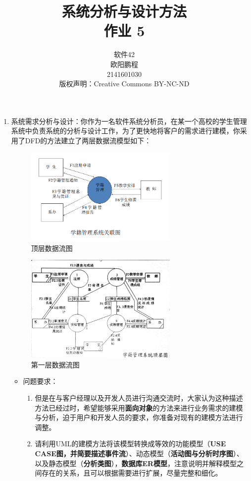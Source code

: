 \documentclass[UTF8]{ctexart}
\title{系统分析与设计方法 \\ 作业 5}
\author{软件42 \\ 欧阳鹏程 \\ 2141601030 \\ 版权声明：Creative Commons BY-NC-ND}
\begin{document}
\maketitle

\begin{enumerate}
	\item 
	系统需求分析与设计：你作为一名软件系统分析员，在某一个高校的学生管理系统中负责系统的分析与设计工作，为了更快地将客户的需求进行建模，你采用了DFD的方法建立了两层数据流模型如下：
	\begin{figure}[H]
		\centering
		\includegraphics[width=0.7\textwidth]{1}
		\caption{顶层数据流图}
		\label{fig:1}
	\end{figure}
	\begin{figure}[H]
		\centering
		\includegraphics[width=0.7\textwidth]{2}
		\caption{第一层数据流图}
		\label{fig:2}
	\end{figure}
	\begin{itemize}
		\item 问题要求：
		\begin{enumerate}
			\item 但是在与客户经理以及开发人员进行沟通交流时，大家认为这种描述方法已经过时，希望能够采用\textbf{面向对象}的方法来进行业务需求的建模与分析，迫于用户和开发人员的要求，你准备对现有的建模方法进行调整。
			\item 请利用UML的建模方法将该模型转换成等效的功能模型（\textbf{USE CASE图，并简要描述事件流}）、动态模型（\textbf{活动图与分析时序图}）、以及静态模型（\textbf{分析类图}），\textbf{数据库ER模型}，注意说明并解释模型之间存在的关系，且可以根据需要进行扩展，尽量完整和细化。
		\end{enumerate}
	\end{itemize}
\end{enumerate}
\end{document}
